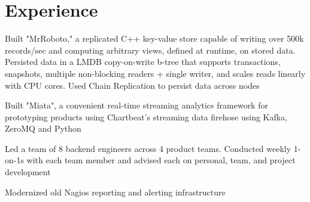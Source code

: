 \documentclass[]{deedy-resume-openfont}
\begin{document}
{}

\section{Experience}
    \begin{tightemize}
        \item
            Built "MrRoboto," a replicated C++ key-value store capable of
            writing over 500k records/sec and computing arbitrary views,
            defined at runtime, on stored data. Persisted data in a LMDB
            copy-on-write b-tree that supports transactions, snapshots,
            multiple non-blocking readers + single writer, and scales reads
            linearly with CPU cores. Used Chain Replication to persist data
            across nodes
        \item
            Built "Miata", a convenient real-time streaming analytics framework
            for prototyping products using Chartbeat's streaming data firehose
            using Kafka, ZeroMQ and Python
        \item
            Led a team of 8 backend engineers across 4 product teams. Conducted
            weekly 1-on-1s with each team member and advised each on personal,
            team, and project development
        \item
            Modernized old Nagios reporting and alerting infrastructure
    \end{tightemize}
    \vspace{5pt}
\end{document}
